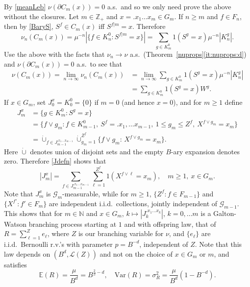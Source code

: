 \documentclass[12pt]{article}
\makeatletter
\renewenvironment{proof}[1][\proofname]{%
\par\pushQED{\qed}\normalfont%
\topsep6\p@\@plus6\p@\relax
\trivlist\item[\hskip\labelsep\bfseries#1\@addpunct{.}]%
\ignorespaces
}{%
\popQED\endtrivlist\@endpefalse
}
\numberwithin{theorem}{section}
\theoremstyle{def}
\numberwithin{equation}{section}
\newcommand{\E}{\mathbb{E}}
\newcommand{\Z}{\mathbb{Z}}
\newcommand{\N}{\mathbb{N}}
\newcommand{\cG}{\mathcal G}
\newcommand{\cL}{\mathcal{L}}
\makeatother
\begin{document}
\begin{proof} By \eqref{meanLeb} $\nu(\partial C_m(x))=0$ a.s.\ and so we only need prove the above without the closures.  
	Let $m\in\Z_+$ and $x=.x_1\dots x_m\in G_m$.  If $n\ge m$  and $f\in F_n$, then by \eqref{BaryS}, $S^f\in C_m(x)$ iff $S^{f|m}=x$. 
	Therefore
\begin{equation*} \nu_n(C_m(x))=\mu^{-n}|\{f\in K_n^0:S^{f|m}=x\}|=\sum_{g\in K^0_m}1(S^g=x)\mu^{-n}|K^g_n|.
\end{equation*}
Use the above with the facts that $\nu_n\to \nu$ a.s.\ (Theorem~\ref{nuprops}\ref{it:nuprops:d}) and $\nu(\partial C_m(x))=0$ a.s.\ to see that 
\begin{align}\label{nuCm}
\nonumber\nu(C_m(x))=\lim_{n\to\infty}\nu_n(C_m(x))&=\lim_{n\to\infty}\sum_{g\in K^0_m}1(S^g=x)\mu^{-n}|K^g_n|\\
&=\sum_{g\in K_m^0}1(S^g=x)W^g.
\end{align}
If $x\in G_m$, set $J_0^x=K^0_0=\{0\}$ if $m=0$ (and hence $x=0$), and for $m\ge 1$ define
\begin{align}\label{Jdefn}
\nonumber J_m^x&=\{g\in K_m^0:S^g=x\}\\
\nonumber &=\{f\vee g_m: f\in K^0_{m-1},\ S^f=.x_1,\dots x_{m-1},\ 1\le g_m\le Z^f,\ X^{f\vee g_m}=x_m\}\\
&=\dot\cup_{f\in J_{m-1}^{.x_1\dots x_{m-1}}}\dot\cup_{g_m=1}^{Z^f}\{f\vee g_m:\, X^{f\vee g_m}=x_m\}.
\end{align}
Here $\dot \cup$ denotes union of disjoint sets and the empty $B$-ary expansion denotes zero.  
Therefore \eqref{Jdefn} shows that
\begin{equation}\label{eq:evolution Jmx}
|J^x_m|=\sum_{f\in J^{.x_1\dots x_{m-1}}_{m-1}}\sum_{\ell=1}^{Z^f}1(X^{f\vee\ell}=x_m),\quad m\ge 1,\ x\in G_m.
\end{equation}
Note that $J^x_m$ is $\cG_m$-measurable, while for $m\ge 1$, $\{Z^f:f\in F_{m-1}\}$ and $\{X^{f'}:f'\in F_m\}$ are independent i.i.d.\ collections, jointly independent of $\cG_{m-1}$. 
This shows that for $m\in \N$ and $x\in G_m$, $k\mapsto |J^{.x_1\dots x_k}_k|$, $k=0,\dots m$ is a Galton-Watson branching process starting at $1$ and with offspring law, that of $R=\sum_{\ell =1}^Z e_\ell$, where $Z$ is our branching variable for $\nu$, and $\{e_\ell\}$ are i.i.d.\ Bernoulli r.v.'s with parameter $p=B^{-d}$, independent of $Z$. 
Note that this law depends on $(B^d,\cL(Z))$ and not on the choice of $x\in G_m$ or $m$, and satisfies
\[\E(R)=\frac{\mu} {B^{d}}=B^{\frac{2}{\beta}-d},\quad \text{Var}(R)=\sigma^2_R=\frac{\mu}{B^d}(1-B^{-d}).  \]

\end{proof}
\end{document}
